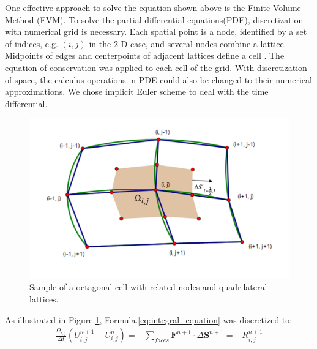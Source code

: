 \documentclass[%
 reprint,
 amsmath,amssymb,
pra,
]{revtex4-1}
\begin{document}
\begin{itemize}
One effective approach to solve the equation shown above is the Finite Volume Method (FVM). To solve the partial differential equations(PDE), discretization with numerical grid is necessary. Each spatial point is a node, identified by a set of indices, e.g. $\left(i, j\right)$ in the 2-D case, and several nodes combine a lattice. Midpoints of edges and centerpoints of adjacent lattices define a cell \cite{economon2015su2}. The equation of conservation was applied to each cell of the grid. With discretization of space, the calculus operations in PDE could also be changed to their numerical approximations. We chose implicit Euler scheme to deal with the time differential.
\begin{figure}[h]
	\centering  
	\includegraphics[width=0.7\linewidth]{Fig/grid}
	\caption{Sample of a octagonal cell with related nodes and quadrilateral lattices.}
	\label{fig:sample_of_cell}
\end{figure}

As illustrated in Figure.\ref{fig:sample_of_cell}, Formula.\ref{eq:integral_equation} was discretized to:
\begin{align}
	\frac{\Omega_{i, j}}{\Delta t}\left(U^{n+1}_{i, j}-U^{n}_{i, j} \right) = -\sum_{faces}\bm{F}^{n+1}\cdot\Delta\bm{S}^{n+1} = -R^{n+1}_{i, j}
\end{align}


\end{itemize}
\end{document}
